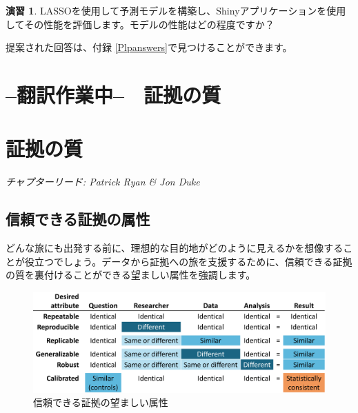 \documentclass[
  11pt]{book}
\theoremstyle{definition}
\theoremstyle{definition}
\theoremstyle{definition}
\newtheorem{exercise}{演習}[chapter]
\theoremstyle{definition}
\theoremstyle{remark}
\begin{document}
\begin{exercise}
\protect\hypertarget{exr:exercisePlp3}{}\label{exr:exercisePlp3}LASSOを使用して予測モデルを構築し、Shinyアプリケーションを使用してその性能を評価します。モデルの性能はどの程度ですか？
\end{exercise}

提案された回答は、付録 \ref{Plpanswers}で見つけることができます。

\chapter*{--翻訳作業中--　証拠の質}\label{ux7ffbux8a33ux4f5cux696dux4e2d-ux8a3cux62e0ux306eux8cea}

\chapter{証拠の質}\label{EvidenceQuality}

\emph{チャプターリード: Patrick Ryan \& Jon Duke}


\section{信頼できる証拠の属性}\label{ux4fe1ux983cux3067ux304dux308bux8a3cux62e0ux306eux5c5eux6027}

どんな旅にも出発する前に、理想的な目的地がどのように見えるかを想像することが役立つでしょう。データから証拠への旅を支援するために、信頼できる証拠の質を裏付けることができる望ましい属性を強調します。

\begin{figure}

{\centering \includegraphics[width=1\linewidth]{images/EvidenceQuality/reliableevidenceattributes} 

}

\caption{信頼できる証拠の望ましい属性}\label{fig:attributesOfEvidence}
\end{figure}
\end{document}
